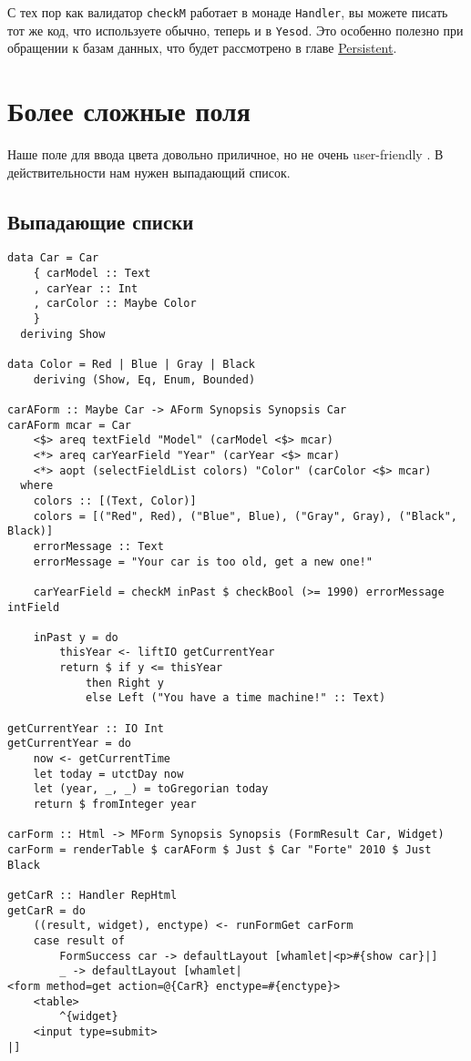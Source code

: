 \begin{remark}
С тех пор как валидатор \lstinline'checkM' работает в монаде \lstinline'Handler', вы
можете писать тот же код, что используете обычно, теперь и в \lstinline'Yesod'. Это 
особенно полезно при обращении к базам данных, что будет рассмотрено в главе
\hyperref[chap:persistent]{Persistent}.
\end{remark}

\section{Более сложные поля}
Наше поле для ввода цвета довольно приличное, но не очень user-friendly
. В
действительности нам нужен выпадающий список.

\subsection{Выпадающие списки}

\begin{lstlisting}
data Car = Car
    { carModel :: Text
    , carYear :: Int
    , carColor :: Maybe Color
    }
  deriving Show

data Color = Red | Blue | Gray | Black
    deriving (Show, Eq, Enum, Bounded)

carAForm :: Maybe Car -> AForm Synopsis Synopsis Car
carAForm mcar = Car
    <$> areq textField "Model" (carModel <$> mcar)
    <*> areq carYearField "Year" (carYear <$> mcar)
    <*> aopt (selectFieldList colors) "Color" (carColor <$> mcar)
  where
    colors :: [(Text, Color)]
    colors = [("Red", Red), ("Blue", Blue), ("Gray", Gray), ("Black", Black)]
    errorMessage :: Text
    errorMessage = "Your car is too old, get a new one!"

    carYearField = checkM inPast $ checkBool (>= 1990) errorMessage intField

    inPast y = do
        thisYear <- liftIO getCurrentYear
        return $ if y <= thisYear
            then Right y
            else Left ("You have a time machine!" :: Text)

getCurrentYear :: IO Int
getCurrentYear = do
    now <- getCurrentTime
    let today = utctDay now
    let (year, _, _) = toGregorian today
    return $ fromInteger year

carForm :: Html -> MForm Synopsis Synopsis (FormResult Car, Widget)
carForm = renderTable $ carAForm $ Just $ Car "Forte" 2010 $ Just Black

getCarR :: Handler RepHtml
getCarR = do
    ((result, widget), enctype) <- runFormGet carForm
    case result of
        FormSuccess car -> defaultLayout [whamlet|<p>#{show car}|]
        _ -> defaultLayout [whamlet|
<form method=get action=@{CarR} enctype=#{enctype}>
    <table>
        ^{widget}
    <input type=submit>
|]
\end{lstlisting}

